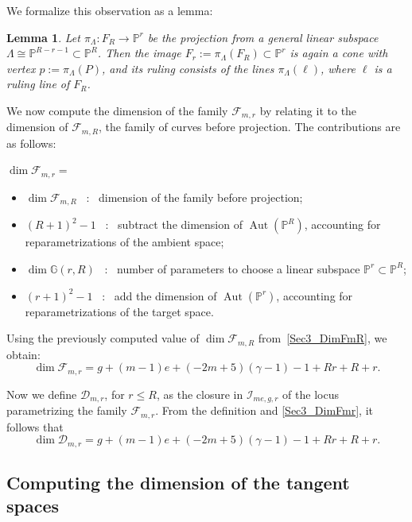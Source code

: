 \documentclass[a4paper,12pt]{amsart}
\newtheorem{lemma}[thm]{Lemma}
\def\dim{\operatorname{dim}}
\def\Aut{\operatorname{Aut}}%
\begin{document}
We formalize this observation as a lemma:

\begin{lemma}\label{Sec4_FR->Fr}
Let $\pi_{\Lambda} : F_R \to \mathbb{P}^r$ be the projection from a general linear subspace $\Lambda \cong \mathbb{P}^{R - r - 1} \subset \mathbb{P}^R$. Then the image $F_r := \pi_{\Lambda}(F_R) \subset \mathbb{P}^r$ is again a cone with vertex $p := \pi_{\Lambda}(P)$, and its ruling consists of the lines $\pi_{\Lambda}(\ell)$, where $\ell$ is a ruling line of $F_R$.
\end{lemma}

We now compute the dimension of the family $\mathcal{F}_{m,r}$ by relating it to the dimension of $\mathcal{F}_{m,R}$, the family of curves before projection. The contributions are as follows:

\noindent
$\dim \mathcal{F}_{m,r} = $
\begin{itemize}[font=\sffamily, leftmargin=1.3cm, style=nextline]
    \item[$+$] $ \dim \mathcal{F}_{m,R} $ \ : \ dimension of the family before projection;

    \item[$-$] $(R+1)^2 - 1$ \ : \ subtract the dimension of $\Aut(\mathbb{P}^R)$, accounting for reparametrizations of the ambient space;

    \item[$+$] $\dim \mathbb{G}(r, R)$ \ : \ number of parameters to choose a linear subspace $\mathbb{P}^r \subset \mathbb{P}^R$;

    \item[$+$] $(r+1)^2 - 1$ \ : \ add the dimension of $\Aut(\mathbb{P}^r)$, accounting for reparametrizations of the target space.
\end{itemize}
Using the previously computed value of $\dim \mathcal{F}_{m,R}$ from~\eqref{Sec3_DimFmR}, we obtain:
\begin{equation}\label{Sec3_DimFmr}
 \dim \mathcal{F}_{m,r} = g + (m - 1)e + (-2m + 5)(\gamma - 1) - 1 + Rr + R + r .
\end{equation}

Now we define $\mathcal{D}_{m,r}$, for $r \leq R$, as the closure in $\mathcal{I}_{me, g, r}$ of the locus parametrizing the family $\mathcal{F}_{m,r}$. From the definition and \eqref{Sec3_DimFmr}, it follows that
\[
 \dim \mathcal{D}_{m,r} = g + (m - 1)e + (-2m + 5)(\gamma - 1) - 1 + Rr + R + r .
\]

\subsection{Computing the dimension of the tangent spaces}
\end{document}
